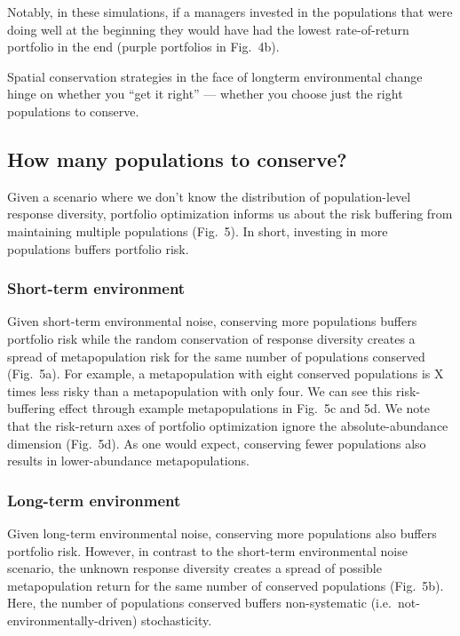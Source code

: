 Notably, in these simulations, if a managers invested in the populations that were doing well at the beginning they would have had the lowest rate-of-return portfolio in the end (purple portfolios in Fig.~4b).

Spatial conservation strategies in the face of longterm environmental change hinge on whether you ``get it right'' --- whether you choose just the right populations to conserve.

\subsection{How many populations to conserve?}

Given a scenario where we don't know the distribution of population-level response diversity, portfolio optimization informs us about the risk buffering from maintaining multiple populations (Fig.~5). In short, investing in more populations buffers portfolio risk.

\subsubsection{Short-term environment}

Given short-term environmental noise, conserving more populations buffers portfolio risk while the random conservation of response diversity creates a spread of metapopulation risk for the same number of populations conserved (Fig.~5a). For example, a metapopulation with eight conserved populations is X times less risky than a metapopulation with only four. We can see this risk-buffering effect through example metapopulations in Fig.~5c and 5d. We note that the risk-return axes of portfolio optimization ignore the absolute-abundance dimension (Fig.~5d). As one would expect, conserving fewer populations also results in lower-abundance metapopulations.

\subsubsection{Long-term environment}

Given long-term environmental noise, conserving more populations also buffers portfolio risk. However, in contrast to the short-term environmental noise scenario, the unknown response diversity creates a spread of possible metapopulation return for the same number of conserved populations (Fig.~5b). Here, the number of populations conserved buffers non-systematic (i.e.~not-environmentally-driven) stochasticity.

